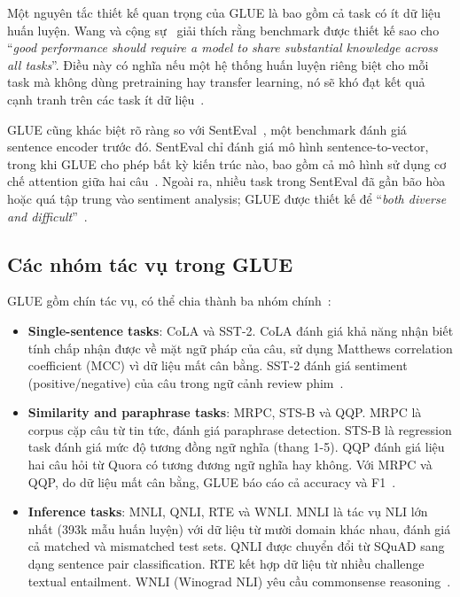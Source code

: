 Một nguyên tắc thiết kế quan trọng của GLUE là bao gồm cả task có ít dữ liệu huấn luyện. Wang và cộng sự~\cite{glue} giải thích rằng benchmark được thiết kế sao cho ``\textit{good performance should require a model to share substantial knowledge across all tasks}''. Điều này có nghĩa nếu một hệ thống huấn luyện riêng biệt cho mỗi task mà không dùng pretraining hay transfer learning, nó sẽ khó đạt kết quả cạnh tranh trên các task ít dữ liệu~\cite{glue}.

GLUE cũng khác biệt rõ ràng so với SentEval~\cite{conneau2018senteval}, một benchmark đánh giá sentence encoder trước đó. SentEval chỉ đánh giá mô hình sentence-to-vector, trong khi GLUE cho phép bất kỳ kiến trúc nào, bao gồm cả mô hình sử dụng cơ chế attention giữa hai câu~\cite{glue}. Ngoài ra, nhiều task trong SentEval đã gần bão hòa hoặc quá tập trung vào sentiment analysis; GLUE được thiết kế để ``\textit{both diverse and difficult}''~\cite{glue}.

\subsection{Các nhóm tác vụ trong GLUE}

GLUE gồm chín tác vụ, có thể chia thành ba nhóm chính~\cite{glue}:

\begin{itemize}
    \item \textbf{Single-sentence tasks}: CoLA và SST-2. CoLA đánh giá khả năng nhận biết tính chấp nhận được về mặt ngữ pháp của câu, sử dụng Matthews correlation coefficient (MCC) vì dữ liệu mất cân bằng. SST-2 đánh giá sentiment (positive/negative) của câu trong ngữ cảnh review phim~\cite{glue}.

    \item \textbf{Similarity and paraphrase tasks}: MRPC, STS-B và QQP. MRPC là corpus cặp câu từ tin tức, đánh giá paraphrase detection. STS-B là regression task đánh giá mức độ tương đồng ngữ nghĩa (thang 1-5). QQP đánh giá liệu hai câu hỏi từ Quora có tương đương ngữ nghĩa hay không. Với MRPC và QQP, do dữ liệu mất cân bằng, GLUE báo cáo cả accuracy và F1~\cite{glue}.

    \item \textbf{Inference tasks}: MNLI, QNLI, RTE và WNLI. MNLI là tác vụ NLI lớn nhất (393k mẫu huấn luyện) với dữ liệu từ mười domain khác nhau, đánh giá cả matched và mismatched test sets. QNLI được chuyển đổi từ SQuAD sang dạng sentence pair classification. RTE kết hợp dữ liệu từ nhiều challenge textual entailment. WNLI (Winograd NLI) yêu cầu commonsense reasoning~\cite{glue}.
\end{itemize}

